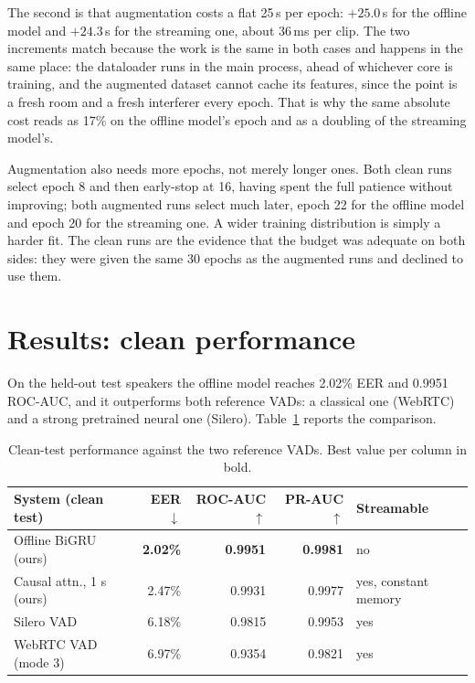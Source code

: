 \documentclass{article}
\begin{document}
The second is that augmentation costs a flat 25\,s per epoch: $+25.0$\,s for the offline
model and $+24.3$\,s for the streaming one, about 36\,ms per clip. The two increments
match because the work is the same in both cases and happens in the same place: the dataloader runs in the main process, ahead of whichever core is training, and the
augmented dataset cannot cache its features, since the point is a fresh room and a fresh
interferer every epoch. That is why the same absolute cost reads as 17\% on the offline
model's epoch and as a doubling of the streaming model's.

Augmentation also needs more epochs, not merely longer ones. Both clean runs select
epoch 8 and then early-stop at 16, having spent the full patience without improving; both
augmented runs select much later, epoch 22 for the offline model and epoch 20 for the
streaming one. A wider training distribution is simply a harder fit. The clean runs are
the evidence that the budget was adequate on both sides: they were given the same 30
epochs as the augmented runs and declined to use them.

\section{Results: clean performance}
\label{sec:clean}

On the held-out test speakers the offline model reaches 2.02\% EER and 0.9951 ROC-AUC, and it outperforms both reference VADs: a classical one (WebRTC) and a strong pretrained neural one (Silero). Table~\ref{tab:clean} reports the comparison.

\begin{table}[H]
    \centering
    \caption{Clean-test performance against the two reference VADs. Best value per column in bold.}
    \label{tab:clean}
    \setlength{\tabcolsep}{4pt}
    \small
    \begin{tabular}{lrrrp{1.9cm}}
        \toprule
        System (clean test) & EER $\downarrow$ & ROC-AUC $\uparrow$ & PR-AUC $\uparrow$ & Streamable \\
        \midrule
        Offline BiGRU (ours)           & \textbf{2.02\%} & \textbf{0.9951} & \textbf{0.9981} & no \\
        Causal attn., 1 s (ours)       & 2.47\%          & 0.9931          & 0.9977          & yes, constant memory \\
        Silero VAD                     & 6.18\%          & 0.9815          & 0.9953          & yes \\
        WebRTC VAD (mode 3)            & 6.97\%          & 0.9354          & 0.9821          & yes \\
        \bottomrule
    \end{tabular}
\end{table}
\end{document}
